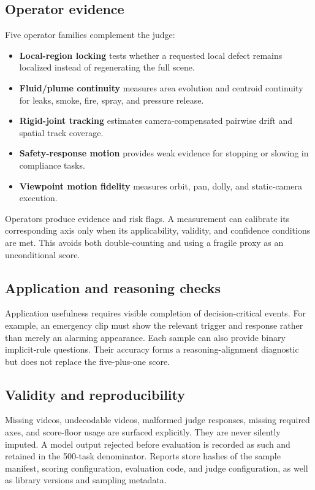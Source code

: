\subsection{Operator evidence}

Five operator families complement the judge:
\begin{itemize}[leftmargin=*]
    \item \textbf{Local-region locking} tests whether a requested local defect remains localized instead of regenerating the full scene.
    \item \textbf{Fluid/plume continuity} measures area evolution and centroid continuity for leaks, smoke, fire, spray, and pressure release.
    \item \textbf{Rigid-joint tracking} estimates camera-compensated pairwise drift and spatial track coverage.
    \item \textbf{Safety-response motion} provides weak evidence for stopping or slowing in compliance tasks.
    \item \textbf{Viewpoint motion fidelity} measures orbit, pan, dolly, and static-camera execution.
\end{itemize}
Operators produce evidence and risk flags. A measurement can calibrate its corresponding axis only when its applicability, validity, and confidence conditions are met. This avoids both double-counting and using a fragile proxy as an unconditional score.

\subsection{Application and reasoning checks}

Application usefulness requires visible completion of decision-critical events. For example, an emergency clip must show the relevant trigger and response rather than merely an alarming appearance. Each sample can also provide binary implicit-rule questions. Their accuracy forms a reasoning-alignment diagnostic but does not replace the five-plus-one score.

\subsection{Validity and reproducibility}

Missing videos, undecodable videos, malformed judge responses, missing required axes, and score-floor usage are surfaced explicitly. They are never silently imputed. A model output rejected before evaluation is recorded as such and retained in the 500-task denominator. Reports store hashes of the sample manifest, scoring configuration, evaluation code, and judge configuration, as well as library versions and sampling metadata.
